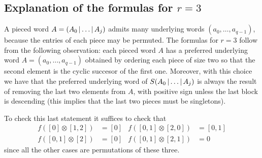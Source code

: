 \subsection{Explanation of the formulas for \texorpdfstring{$r=3$}{r = 3}} A pieced word $A = (A_0\operatorname{|}\ldots\operatorname{|} A_j)$ admits many underlying words $(a_0,\ldots,a_{q-1})$, because the entries of each piece may be permuted. The formulas for $r=3$ follow from the following observation: each pieced word $A$ has a preferred underlying word $A = (a_0,\ldots,a_{q-1})$ obtained by ordering each piece of size two so that the second element is the cyclic succesor of the first one. Moreover, with this choice we have that the preferred underlying word of $S(A_0\operatorname{|}\ldots\operatorname{|} A_{j})$ is always the result of removing the last two elements from $A$, with positive sign unless the last block is descending (this implies that the last two pieces must be singletons).

To check this last statement it suffices to check that
\begin{align*}
	f([0]\otimes [1,2]) &= [0]
	&
	f([0,1]\otimes [2,0]) &= [0,1]
	\\
		f([0,1]\otimes [2]) &= [0]
	&
	f([0,1]\otimes [2,1]) &= 0
\end{align*}
since all the other cases are permutations of these three.







